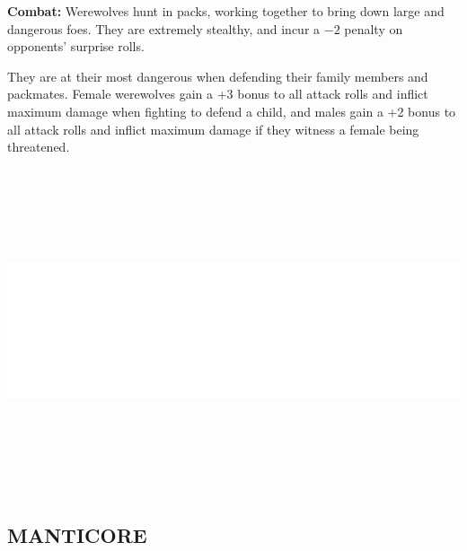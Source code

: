 \begin{multicols}{2}
\textbf{Combat:} Werewolves hunt in packs, working together to bring down large and dangerous foes. They are extremely stealthy, and incur a $-2$ penalty on opponents' surprise rolls.

They are at their most dangerous when defending their family members and packmates. Female werewolves gain a +3 bonus to all attack rolls and inflict maximum damage when fighting to defend a child, and males gain a +2 bonus to all attack rolls and inflict maximum damage if they witness a female being threatened.

\noindent\includegraphics[width=\columnwidth, height=3.75in]{testblock.pdf}

\noindent
\begin{minipage}{\columnwidth}

\vspace{1em}

\subsection{MANTICORE}


\end{minipage}
\end{multicols}
